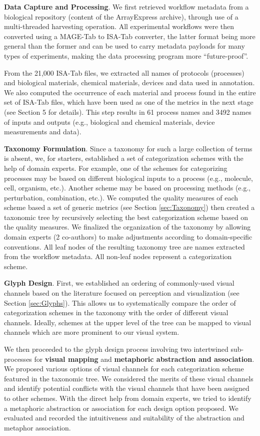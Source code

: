 \textbf{Data Capture and Processing}. We first retrieved workflow metadata from a biological repository (content of the ArrayExpress archive), through use of a multi-threaded harvesting operation. All experimental workflows were then converted using a MAGE-Tab to ISA-Tab converter, the latter format being more general than the former and can be used to carry metadata payloads for many types of experiments, making the data processing program more ``future-proof''.

From the 21,000 ISA-Tab files, we extracted all names of protocols (processes) and biological materials, chemical materials, devices and data used in annotation. We also computed the occurrence of each material and process found in the entire set of ISA-Tab files, which have been used as one of the metrics in the next stage (see Section 5 for details). This step results in 61 process names and 3492 names of inputs and outputs (e.g., biological and chemical materials, device measurements and data).

\textbf{Taxonomy Formulation}. Since a taxonomy for such a large collection of terms is absent, we, for starters, established a set of categorization schemes with the help of domain experts. For example, one of the schemes for categorizing processes may be based on different biological inputs to a process (e.g., molecule, cell, organism, etc.). Another scheme may be based on processing methods (e.g., perturbation, combination, etc.). We computed the quality measures of each scheme based a set of generic metrics (see Section \ref{sec:Taxonomy}) then created a taxonomic tree by recursively selecting the best categorization scheme based on the quality measures. We finalized the organization of the taxonomy by allowing domain experts (2 co-authors) to make adjustments according to domain-specific conventions. All leaf nodes of the resulting taxonomy tree are names extracted from the workflow metadata. All non-leaf nodes represent a categorization scheme.

\textbf{Glyph Design}. First, we established an ordering of commonly-used visual channels based on the literature focused on perception and visualization (see Section \ref{sec:Glyphs}). This allows us to systematically compare the order of categorization schemes in the taxonomy with the order of different visual channels. Ideally, schemes at the upper level of the tree can be mapped to visual channels which are more prominent to our visual system.

We then proceeded to the glyph design process involving two intertwined sub-processes for \textbf{visual mapping} and \textbf{metaphoric abstraction and association}. We proposed various options of visual channels for each categorization scheme featured in the taxonomic tree. We considered the merits of these visual channels and identify potential conflicts with the visual channels that have been assigned to other schemes. With the direct help from domain experts, we tried to identify a metaphoric abstraction
or association for each design option proposed. We evaluated and recorded the intuitiveness and suitability of the abstraction and metaphor association.

